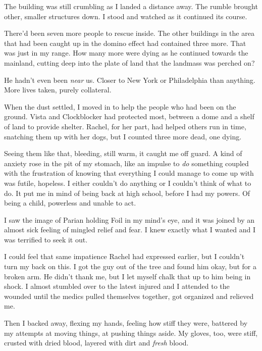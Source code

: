 The building was still crumbling as I landed a distance away.  The rumble brought other, smaller structures down.  I stood and watched as it continued its course.



There'd been seven more people to rescue inside.  The other buildings in the area that had been caught up in the domino effect had contained three more.  That was just in my range.  How many more were dying as he continued towards the mainland, cutting deep into the plate of land that the landmass was perched on?



He hadn't even been \emph{near} us.  Closer to New York or Philadelphia than anything.  More lives taken, purely collateral.



When the dust settled, I moved in to help the people who had been on the ground.  Vista and Clockblocker had protected most, between a dome and a shelf of land to provide shelter.  Rachel, for her part, had helped others run in time, snatching them up with her dogs, but I counted three more dead, one dying.



Seeing them like that, bleeding, still warm, it caught me off guard.  A kind of anxiety rose in the pit of my stomach, like an impulse to \emph{do} something coupled with the frustration of knowing that everything I could manage to come up with was futile, hopeless.  I either couldn't do anything or I couldn't think of what to do.  It put me in mind of being back at high school, before I had my powers.  Of being a child, powerless and unable to act.



I saw the image of Parian holding Foil in my mind's eye, and it was joined by an almost sick feeling of mingled relief and fear.  I knew exactly what I wanted and I was terrified to seek it out.



I could feel that same impatience Rachel had expressed earlier, but I couldn't turn my back on this.  I got the guy out of the tree and found him okay, but for a broken arm.  He didn't thank me, but I let myself chalk that up to him being in shock.  I almost stumbled over to the latest injured and I attended to the wounded until the medics pulled themselves together, got organized and relieved me.



Then I backed away, flexing my hands, feeling how stiff they were, battered by my attempts at moving things, at pushing things aside.  My gloves, too, were stiff, crusted with dried blood, layered with dirt and \emph{fresh} blood.



